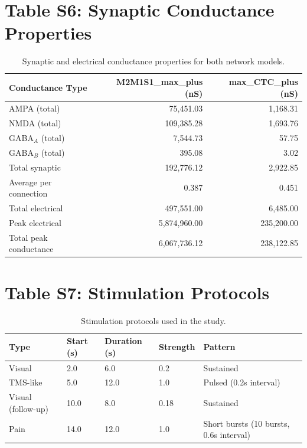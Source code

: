 \documentclass[10pt]{article}
\begin{document}
\section*{Table S6: Synaptic Conductance Properties}

\begin{table}[h]
\centering
\caption{Synaptic and electrical conductance properties for both network models.}
\begin{tabular}{lrr}
\toprule
\textbf{Conductance Type} & \textbf{M2M1S1\_max\_plus (nS)} & \textbf{max\_CTC\_plus (nS)} \\
\midrule
AMPA (total) & 75,451.03 & 1,168.31 \\
NMDA (total) & 109,385.28 & 1,693.76 \\
GABA$_A$ (total) & 7,544.73 & 57.75 \\
GABA$_B$ (total) & 395.08 & 3.02 \\
Total synaptic & 192,776.12 & 2,922.85 \\
Average per connection & 0.387 & 0.451 \\
Total electrical & 497,551.00 & 6,485.00 \\
Peak electrical & 5,874,960.00 & 235,200.00 \\
Total peak conductance & 6,067,736.12 & 238,122.85 \\
\bottomrule
\end{tabular}
\end{table}

\section*{Table S7: Stimulation Protocols}

\begin{table}[h]
\centering
\caption{Stimulation protocols used in the study.}
\begin{tabular}{lllll}
\toprule
\textbf{Type} & \textbf{Start (s)} & \textbf{Duration (s)} & \textbf{Strength} & \textbf{Pattern} \\
\midrule
Visual & 2.0 & 6.0 & 0.2 & Sustained \\
TMS-like & 5.0 & 12.0 & 1.0 & Pulsed (0.2s interval) \\
Visual (follow-up) & 10.0 & 8.0 & 0.18 & Sustained \\
Pain & 14.0 & 12.0 & 1.0 & Short bursts (10 bursts, 0.6s interval) \\
\bottomrule
\end{tabular}
\end{table}
\end{document}
